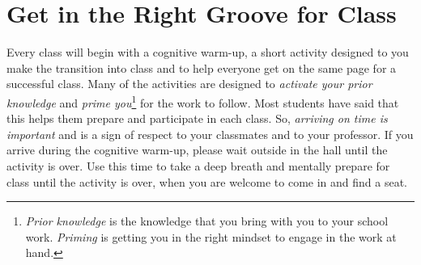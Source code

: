 \section{Get in the Right Groove for Class}
Every class will begin with a \textsf{cognitive warm-up}, a short activity designed to you make the transition into class and to help everyone get on the same page for a successful class. Many of the activities are designed to \textit{activate your prior knowledge} and \textit{prime you}\footnote{\textit{Prior knowledge} is the knowledge that you bring with you to your school work. \textit{Priming} is getting you in the right mindset to engage in the work at hand.} for the work to follow. Most students have said that this helps them prepare and participate in each class. So, \textit{arriving on time is important} and is a sign of respect to your classmates and to your professor. If you arrive during the cognitive warm-up, please wait outside in the hall until the activity is over. Use this time to take a deep breath and mentally prepare for class until the activity is over, when you are welcome to come in and find a seat.
